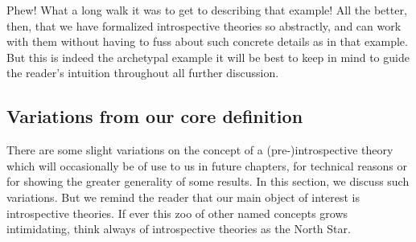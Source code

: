 \documentclass[./main.tex]{subfiles}
\begin{document}
Phew! What a long walk it was to get to describing that example! All the better, then, that we have formalized introspective theories so abstractly, and can work with them without having to fuss about such concrete details as in that example. But this is indeed the archetypal example it will be best to keep in mind to guide the reader's intuition throughout all further discussion.

\subsection{Variations from our core definition}
There are some slight variations on the concept of a (pre-)introspective theory which will occasionally be of use to us in future chapters, for technical reasons or for showing the greater generality of some results. In this section, we discuss such variations. But we remind the reader that our main object of interest is introspective theories. If ever this zoo of other named concepts grows intimidating, think always of introspective theories as the North Star.
\end{document}
